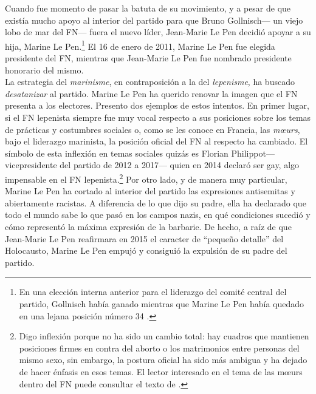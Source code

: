 Cuando fue momento de pasar la batuta de su movimiento, y a pesar de que existía mucho apoyo al interior del partido para que Bruno Gollnisch--- un viejo lobo de mar del FN--- fuera el nuevo líder, Jean-Marie Le Pen decidió apoyar a su hija, Marine Le Pen.\footnote{En una elección interna anterior para el liderazgo del comité central del partido, Gollnisch había ganado mientras que Marine Le Pen había quedado en una lejana posición número 34 \parencite[265]{Williams12}.} El 16 de enero de 2011, Marine Le Pen fue elegida presidente del FN, mientras que Jean-Marie Le Pen fue nombrado presidente honorario del mismo.\\ 

La estrategia del \textit{marinisme}, en contraposición a la del \textit{lepenisme}, ha buscado \textit{desatanizar} al partido. Marine Le Pen ha querido renovar la imagen que el FN presenta a los electores. Presento dos ejemplos de estos intentos. En primer lugar, si el FN lepenista siempre fue muy vocal respecto a sus posiciones sobre los temas de prácticas y costumbres sociales o, como se les conoce en Francia, las \textit{m\oe{}urs}, bajo el liderazgo marinista, la posición oficial del FN al respecto ha cambiado. El símbolo de esta inflexión en temas sociales quizás es Florian Philippot--- vicepresidente del partido de 2012 a 2017--- quien en 2014 declaró ser gay, algo impensable en el FN lepenista.\footnote{Digo inflexión porque no ha sido un cambio total: hay cuadros que mantienen posiciones firmes en contra del aborto o los matrimonios entre personas del mismo sexo, sin embargo, la postura oficial ha sido más ambigua y ha dejado de hacer énfasis en esos temas. El lector interesado en el tema de las m\oe{}urs dentro del FN puede consultar el texto de \textcite{Crepon15}.} Por otro lado, y de manera muy particular, Marine Le Pen ha cortado al interior del partido las expresiones antisemitas y abiertamente racistas. A diferencia de lo que dijo su padre, ella ha declarado que todo el mundo sabe lo que pasó en los campos nazis, en qué condiciones sucedió y cómo representó la máxima expresión de la barbarie. De hecho, a raíz de que Jean-Marie Le Pen reafirmara en 2015 el caracter de ``pequeño detalle'' del Holocausto, Marine Le Pen empujó y consiguió la expulsión de su padre del partido.\\

